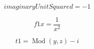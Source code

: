 \documentclass[letterpaper, 8pt]{extarticle}
\begin{document}
\begin{dmath*}
imaginaryUnitSquared =
    -1
\end{dmath*}


\begin{dmath*}
f1x =
    \frac{1}{x^{2}}
\end{dmath*}


\begin{dmath*}
t1 =
    \operatorname{Mod}{\left (y,z \right )} - i
\end{dmath*}
\end{document}
